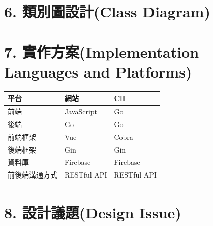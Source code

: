 \documentclass{report}
\begin{document}
\section*{6. 類別圖設計(Class Diagram)}


\section*{7. 實作方案(Implementation Languages and Platforms)}

\begin{center}
	\begin{tabular}{|l|l|l|}
		\hline
		平台 & 網站 & ClI \\ \hline
		前端 & JavaScript & Go \\ \hline
		後端 & Go & Go \\ \hline
		前端框架 & Vue & Cobra \\ \hline	
		後端框架 & Gin & Gin \\ \hline
		資料庫 & Firebase & Firebase \\ \hline
		前後端溝通方式 & RESTful API & RESTful API \\ \hline
	\end{tabular}
\end{center}

\section*{8. 設計議題(Design Issue)}
\end{document}
